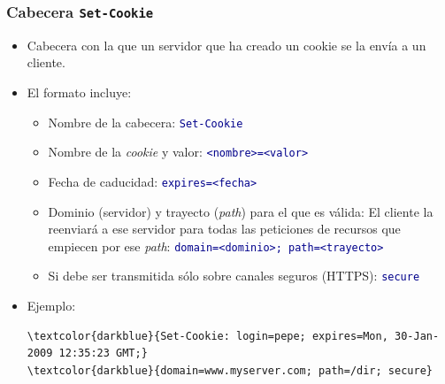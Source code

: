 \documentclass[hyperref={pdfpagelabels=true},ucs]{beamer}
\begin{document}
\begin{frame}[fragile]
\frametitle{Cabecera \texttt{Set-Cookie}}

\begin{itemize}
\item Cabecera con la que un servidor que ha creado un cookie se la
  envía a un cliente.

\item El formato incluye:

  \begin{itemize}
  \item Nombre de la cabecera: \textcolor{darkblue}{\Verb|Set-Cookie|}
  \item Nombre de la \emph{cookie} y valor: \textcolor{darkblue}{\Verb|<nombre>=<valor>|}
  \item Fecha de caducidad: \textcolor{darkblue}{\Verb|expires=<fecha>|}
  \item Dominio (servidor) y trayecto (\emph{path}) para el que es válida: El
    cliente la reenviará a ese servidor para todas las peticiones de
    recursos que empiecen por ese \emph{path}: \textcolor{darkblue}{\Verb|domain=<dominio>; path=<trayecto>|}
  \item Si debe ser transmitida sólo sobre canales seguros (HTTPS):
    \textcolor{darkblue}{\Verb|secure|}
  \end{itemize}

\item Ejemplo:\\
\hspace{-4mm}\begin{scriptsize}
\begin{Verbatim}
\textcolor{darkblue}{Set-Cookie: login=pepe; expires=Mon, 30-Jan-2009 12:35:23 GMT;}
\textcolor{darkblue}{domain=www.myserver.com; path=/dir; secure}
\end{Verbatim}
\end{scriptsize}

\end{itemize}

\end{frame}

\end{document}
